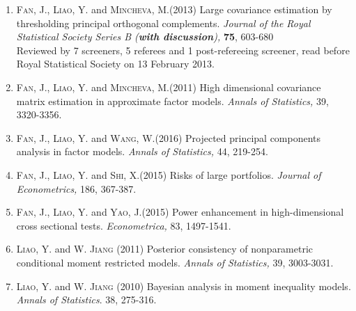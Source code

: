 \documentclass[11pt]{article}
\begin{document}
\begin{enumerate}
\item    \textsc{Fan, J., \textsc{Liao, Y.}} and \textsc{Mincheva, M.}(2013)  Large covariance estimation by thresholding principal orthogonal complements.    {\it  { Journal of the Royal Statistical  Society  Series  B} (\textit{\textbf{with discussion}}),  }    \textbf{75}, 603-680\\
Reviewed by 7 screeners, 5 referees and 1 post-refereeing screener,  read before Royal Statistical Society on 13 February 2013.

		

\item   \textsc{Fan, J., \textsc{Liao, Y.}} and \textsc{Mincheva, M.}(2011) High dimensional  covariance matrix estimation in approximate factor models. {\it  { Annals of Statistics}, }    {39}, 3320-3356.


  \item    \textsc{Fan, J., \textsc{Liao, Y.}} and \textsc{Wang, W.}(2016) Projected principal components analysis in factor models.  {\it  { Annals of Statistics},}    {44}, 219-254.
 
 

  \item    \textsc{Fan, J., \textsc{Liao, Y.}} and \textsc{Shi, X.}(2015) Risks of large portfolios.  {\it  { Journal of Econometrics},    }   {186}, 367-387.

 

 \item    \textsc{Fan, J., \textsc{Liao, Y.}} and \textsc{Yao, J.}(2015) Power enhancement in high-dimensional cross sectional tests. {\it    {Econometrica},  }   {83}, 1497-1541.









	










  \item \textsc{\textsc{Liao, Y.}} and \textsc{W. Jiang} (2011) Posterior consistency of nonparametric conditional moment restricted models.  {\it  { Annals of Statistics},   }    {39}, 3003-3031.

\item \textsc{\textsc{Liao, Y.}} and \textsc{W. Jiang} (2010) Bayesian analysis in moment inequality models.\\
{\it  {Annals of Statistics}}. {38}, 275-316.




\end{enumerate}
\end{document}
